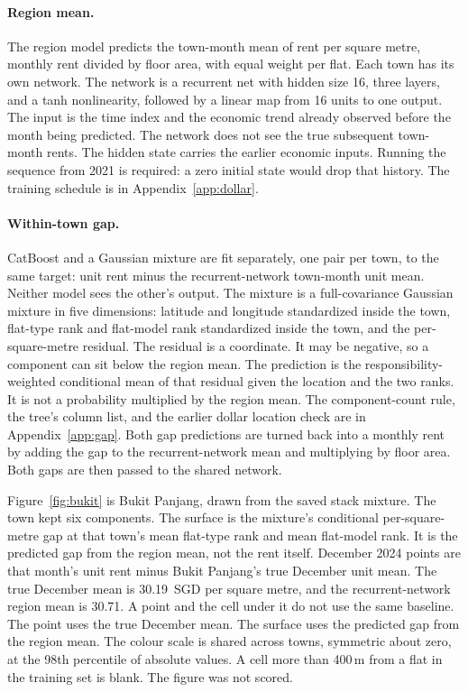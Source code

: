 \documentclass[11pt,a4paper]{article}
\begin{document}
\paragraph{Region mean.}
The region model predicts the town-month mean of rent per square metre, monthly rent divided by floor area, with equal weight per flat.
Each town has its own network.
The network is a recurrent net with hidden size 16, three layers, and a tanh nonlinearity, followed by a linear map from 16 units to one output.
The input is the time index and the economic trend already observed before the month being predicted.
The network does not see the true subsequent town-month rents.
The hidden state carries the earlier economic inputs.
Running the sequence from 2021 is required: a zero initial state would drop that history.
The training schedule is in Appendix~\ref{app:dollar}.

\paragraph{Within-town gap.}
CatBoost and a Gaussian mixture are fit separately, one pair per town, to the same target: unit rent minus the recurrent-network town-month unit mean.
Neither model sees the other's output.
The mixture is a full-covariance Gaussian mixture in five dimensions: latitude and longitude standardized inside the town, flat-type rank and flat-model rank standardized inside the town, and the per-square-metre residual.
The residual is a coordinate.
It may be negative, so a component can sit below the region mean.
The prediction is the responsibility-weighted conditional mean of that residual given the location and the two ranks.
It is not a probability multiplied by the region mean.
The component-count rule, the tree's column list, and the earlier dollar location check are in Appendix~\ref{app:gap}.
Both gap predictions are turned back into a monthly rent by adding the gap to the recurrent-network mean and multiplying by floor area.
Both gaps are then passed to the shared network.

Figure~\ref{fig:bukit} is Bukit Panjang, drawn from the saved stack mixture.
The town kept six components.
The surface is the mixture's conditional per-square-metre gap at that town's mean flat-type rank and mean flat-model rank.
It is the predicted gap from the region mean, not the rent itself.
December 2024 points are that month's unit rent minus Bukit Panjang's true December unit mean.
The true December mean is 30.19~SGD per square metre, and the recurrent-network region mean is 30.71.
A point and the cell under it do not use the same baseline.
The point uses the true December mean.
The surface uses the predicted gap from the region mean.
The colour scale is shared across towns, symmetric about zero, at the 98th percentile of absolute values.
A cell more than 400\,m from a flat in the training set is blank.
The figure was not scored.
\end{document}
